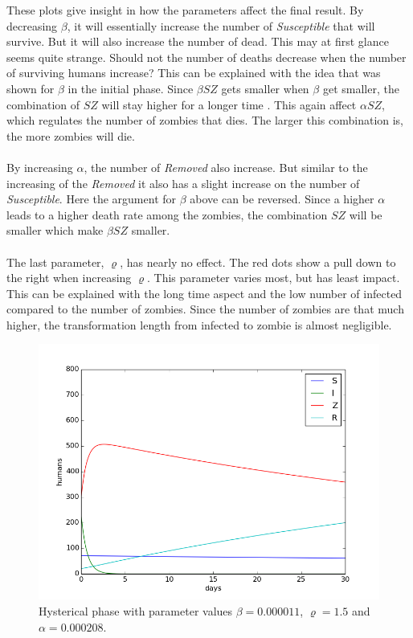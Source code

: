 \documentclass[%
twoside,                 %
final,                   %
10pt]{article}
\begin{document}
These plots give insight in how the parameters affect the final result. By decreasing $\beta$, it will essentially increase the number of \emph{Susceptible} that will survive. But it will also increase the number of dead. This may at first glance seems quite strange. Should not the number of deaths decrease when the number of surviving humans increase? This can be explained with the idea that was shown for $\beta$ in the initial phase. Since $\beta SZ$ gets smaller when $\beta$ get smaller, the combination of $SZ$ will stay higher for a longer time . This again affect $\alpha SZ$, which regulates the number of zombies that dies. The larger this combination is, the more zombies will die. 
\\
\\
By increasing $\alpha$, the number of \emph{Removed} also increase. But similar to the increasing of the \emph{Removed} it also has a slight increase on the number of \emph{Susceptible}. Here the argument for $\beta$ above can be reversed. Since a higher $\alpha$ leads to a higher death rate among the zombies, the combination $SZ$ will be smaller which make $\beta SZ$ smaller.
\\
\\
The last parameter, $\varrho$, has nearly no effect. The red dots show a pull down to the right when increasing $\varrho$. This parameter varies most, but has least impact. This can be explained with the long time aspect and the low number of infected compared to the number of zombies. Since the number of zombies are that much higher, the transformation length from infected to zombie is almost negligible.  


\begin{figure}[ht]
  \centerline{\includegraphics[width=0.9\linewidth]{plots/WD_zombie_hysterical_1.png}}
  \caption{
  Hysterical phase with parameter values $\beta = 0.000011$, $\varrho = 1.5$ and $\alpha = 0.000208$.
  }
\end{figure}
\end{document}
